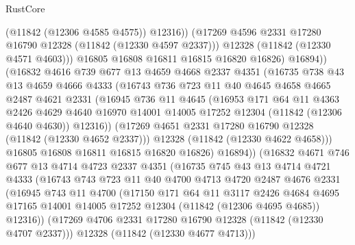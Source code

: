 \begin{lexlean}{RustCore}
\begin{coremodule}
                    (@11842 (@12306 @4585 @4575))
                    @12316))
                (@17269 @4596 @2331 @17280 @16790 @12328 (@11842 (@12330 @4597 @2337)))
                @12328
                (@11842 (@12330 @4571 @4603)))
              @16805
              @16808
              @16811
              @16815
              @16820
              @16826)
            @16894))
        (@16832
          @4616
          @739
          @677
          @13
          @4659
          @4668
          @2337
          @4351
          (@16735
            @738
            @43
            @13
            @4659
            @4666
            @4333
            (@16743
              @736
              @723
              @11
              @40
              @4645
              @4658
              @4665
              @2487
              @4621
              @2331
              (@16945
                @736
                @11
                @4645
                (@16953
                  @171
                  @64
                  @11
                  @4363
                  @2426
                  @4629
                  @4640
                  @16970
                  @14001
                  @14005
                  @17252
                  @12304
                  (@11842 (@12306 @4640 @4630))
                  @12316))
              (@17269 @4651 @2331 @17280 @16790 @12328 (@11842 (@12330 @4652 @2337)))
              @12328
              (@11842 (@12330 @4622 @4658)))
            @16805
            @16808
            @16811
            @16815
            @16820
            @16826)
          @16894))
      (@16832
        @4671
        @746
        @677
        @13
        @4714
        @4723
        @2337
        @4351
        (@16735
          @745
          @43
          @13
          @4714
          @4721
          @4333
          (@16743
            @743
            @723
            @11
            @40
            @4700
            @4713
            @4720
            @2487
            @4676
            @2331
            (@16945
              @743
              @11
              @4700
              (@17150
                @171
                @64
                @11
                @3117
                @2426
                @4684
                @4695
                @17165
                @14001
                @14005
                @17252
                @12304
                (@11842 (@12306 @4695 @4685))
                @12316))
            (@17269 @4706 @2331 @17280 @16790 @12328 (@11842 (@12330 @4707 @2337)))
            @12328
            (@11842 (@12330 @4677 @4713)))

\end{coremodule}
\end{lexlean}
